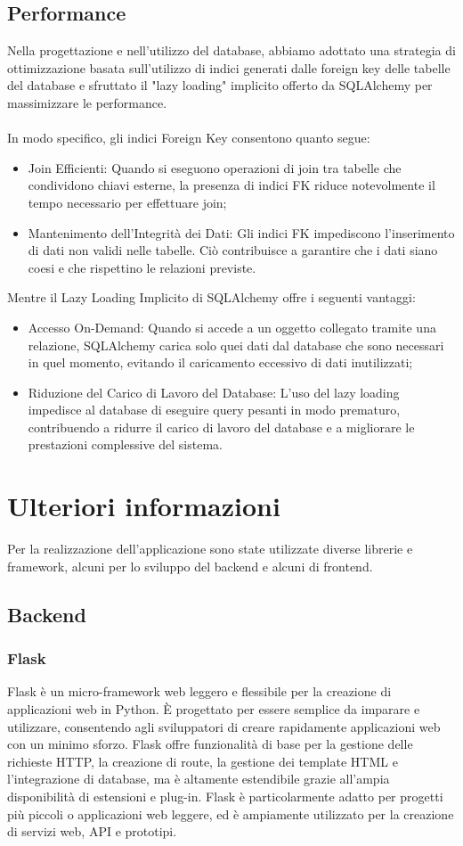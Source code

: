 \documentclass{article}
\begin{document}
\subsection{Performance}
Nella progettazione e nell'utilizzo del database, abbiamo adottato una strategia di ottimizzazione basata sull'utilizzo di indici generati dalle foreign key delle tabelle del database e sfruttato il "lazy loading" implicito offerto da SQLAlchemy per massimizzare le performance.\\\\In modo specifico, gli indici Foreign Key consentono quanto segue:
\begin{itemize}
    \item Join Efficienti: Quando si eseguono operazioni di join tra tabelle che condividono chiavi esterne, la presenza di indici FK riduce notevolmente il tempo necessario per effettuare join;
    \item Mantenimento dell'Integrità dei Dati: Gli indici FK impediscono l'inserimento di dati non validi nelle tabelle. Ciò contribuisce a garantire che i dati siano coesi e che rispettino le relazioni previste.
\end{itemize}
Mentre il Lazy Loading Implicito di SQLAlchemy offre i seguenti vantaggi:
\begin{itemize}
    \item Accesso On-Demand: Quando si accede a un oggetto collegato tramite una relazione, SQLAlchemy carica solo quei dati dal database che sono necessari in quel momento, evitando il caricamento eccessivo di dati inutilizzati;
    \item Riduzione del Carico di Lavoro del Database: L'uso del lazy loading impedisce al database di eseguire query pesanti in modo prematuro, contribuendo a ridurre il carico di lavoro del database e a migliorare le prestazioni complessive del sistema.
\end{itemize}

\section{Ulteriori informazioni}
Per la realizzazione dell'applicazione sono state utilizzate diverse librerie e framework, alcuni per lo sviluppo del backend e alcuni di frontend.
\subsection{Backend}
\subsubsection{Flask}
Flask è un micro-framework web leggero e flessibile per la creazione di applicazioni web in Python. È progettato per essere semplice da imparare e utilizzare, consentendo agli sviluppatori di creare rapidamente applicazioni web con un minimo sforzo. Flask offre funzionalità di base per la gestione delle richieste HTTP, la creazione di route, la gestione dei template HTML e l'integrazione di database, ma è altamente estendibile grazie all'ampia disponibilità di estensioni e plug-in. Flask è particolarmente adatto per progetti più piccoli o applicazioni web leggere, ed è ampiamente utilizzato per la creazione di servizi web, API e prototipi.
\end{document}
